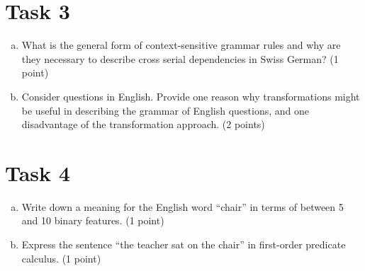 \documentclass[paper=a4, fontsize=11pt]{scrartcl} %
\numberwithin{equation}{section} %
\numberwithin{figure}{section} %
\numberwithin{table}{section} %
\begin{document}
\vspace{3cm}

\section*{Task 3}

\begin{enumerate}[a.]
\item What is the general form of context-sensitive grammar rules and why are they necessary to describe cross serial dependencies in Swiss German? (1 point)
\item Consider questions in English. Provide one reason why transformations might be useful in describing the grammar of English questions,
and one disadvantage of the transformation approach. (2 points) 
\end{enumerate}

\vspace{3cm}

\section*{Task 4}

\begin{enumerate}[a.]
\item Write down a meaning for the English word ``chair'' in terms of between 5 and 10 binary features. (1 point)
\item Express the sentence ``the teacher sat on the chair'' in first-order predicate calculus. (1 point)
\end{enumerate}
\end{document}
